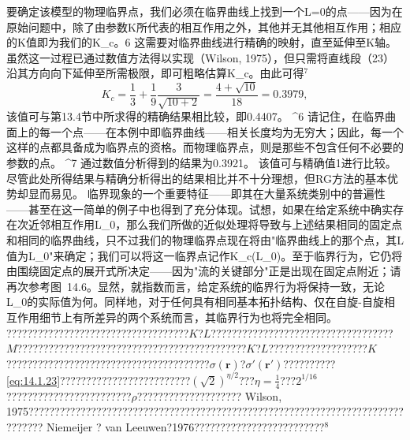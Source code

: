 要确定该模型的物理临界点，我们必须在临界曲线上找到一个L=0的点——因为在原始问题中，除了由参数K所代表的相互作用之外，其他并无其他相互作用；相应的K值即为我们的K\_c。6 这需要对临界曲线进行精确的映射，直至延伸至K轴。虽然这一过程已通过数值方法得以实现（Wilson, 1975），但只需将直线段（23）沿其方向向下延伸至所需极限，即可粗略估算K\_c。由此可得\(^{7}\)
\begin{equation}\tag{14.4.25}\label{eq:14.4.25}
K _ { c } = \frac { 1 } { 3 } + \frac { 1 } { 9 } \frac { 3 } { \sqrt { 10 + 2 } } = \frac { 4 + \sqrt { 10 } } { 18 } = 0 . 39 79 ,
\end{equation}
该值可与第13.4节中所求得的精确结果相比较，即0.4407。
\^{}6 请记住，在临界曲面上的每一个点——在本例中即临界曲线——相关长度均为无穷大；因此，每一个这样的点都具备成为临界点的资格。而物理临界点，则是那些不包含任何不必要的参数的点。
\^{}7 通过数值分析得到的结果为0.3921。
该值可与精确值1进行比较。尽管此处所得结果与精确分析得出的结果相比并不十分理想，但RG方法的基本优势却显而易见。
临界现象的一个重要特征——即其在大量系统类别中的普遍性——甚至在这一简单的例子中也得到了充分体现。试想，如果在给定系统中确实存在次近邻相互作用L\_0，那么我们所做的近似处理将导致与上述结果相同的固定点和相同的临界曲线，只不过我们的物理临界点现在将由"临界曲线上的那个点，其L值为L\_0"来确定；我们可以将这一临界点记作K\_c(L\_0)。至于临界行为，它仍将由围绕固定点的展开式所决定——因为"流的关键部分"正是出现在固定点附近；请再次参考图~14.6。显然，就指数而言，给定系统的临界行为将保持一致，无论L\_0的实际值为何。同样地，对于任何具有相同基本拓扑结构、仅在自旋-自旋相互作用细节上有所差异的两个系统而言，其临界行为也将完全相同。
???????????????????????????????????\(K\)?\(L\)???????????????????????????????????\(M\)????????????????????????????????????????????\(K\)?\(L\)???????????????????\(K\)???????????????????????????????????????\(\sigma(\boldsymbol{r})\)?\(\sigma\prime(\boldsymbol{r}\prime)\)??????????\autoref{eq:14.1.23}?????????????????????????\((\sqrt{2})^{\eta/2}\)???\(\eta = \frac{1}{4}\)???\(2^{1/16}\)????????????????????????\(\rho\)???????????????????? Wilson, 1975??????????????????????????????????????????????????????????????????????????????? Niemeijer ? van Leeuwen?1976?????????????????????????\(^{8}\)
